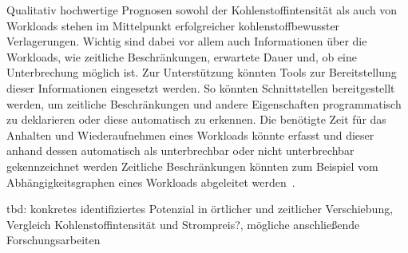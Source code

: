 Qualitativ hochwertige Prognosen sowohl der Kohlenstoffintensität als auch von Workloads stehen im Mittelpunkt erfolgreicher kohlenstoffbewusster Verlagerungen.
Wichtig sind dabei vor allem auch Informationen über die Workloads, wie zeitliche Beschränkungen, erwartete Dauer und, ob eine Unterbrechung möglich ist.
Zur Unterstützung könnten Tools zur Bereitstellung dieser Informationen eingesetzt werden.
So könnten Schnittstellen bereitgestellt werden, um zeitliche Beschränkungen und andere Eigenschaften programmatisch zu deklarieren oder diese automatisch zu erkennen.
Die benötigte Zeit für das Anhalten und Wiederaufnehmen eines Workloads könnte erfasst und dieser anhand dessen automatisch als unterbrechbar oder nicht unterbrechbar gekennzeichnet werden
Zeitliche Beschränkungen könnten zum Beispiel vom Abhängigkeitsgraphen eines Workloads abgeleitet werden~\cite{Wiesner.2021}.

tbd: konkretes identifiziertes Potenzial in örtlicher und zeitlicher Verschiebung, Vergleich Kohlenstoffintensität und Strompreis?, mögliche anschließende Forschungsarbeiten


